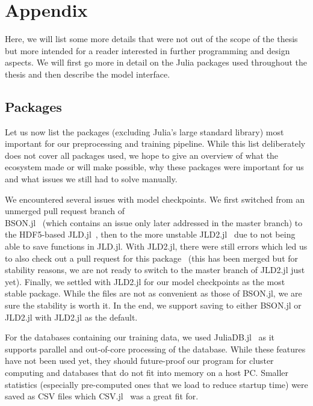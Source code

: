 \section{Appendix}

Here, we will list some more details that were not out of the scope of
the thesis but more intended for a reader interested in further
programming and design aspects. We will first go more in detail on the
Julia packages used throughout the thesis and then describe the model
interface.

\subsection{Packages}
\label{sec:packages}

Let us now list the packages (excluding Julia's large standard
library) most important for our preprocessing and training pipeline.
While this list deliberately does not cover all packages used, we hope
to give an overview of what the ecosystem made or will make possible,
why these packages were important for us and what issues we still had
to solve manually.

We encountered several issues with model checkpoints. We first
switched from an unmerged pull request branch of \\
\mbox{BSON.jl}~\cite{JuliaIOBSONJl2019,keslerSavingArrayLength} (which
contains an issue only later addressed in the master branch) to the
HDF5-based \mbox{JLD.jl}~\cite{JuliaIOJLDJl2019}, then to the more
unstable \mbox{JLD2.jl}~\cite{JuliaIOJLD2Jl2019} due to not being able
to save functions in \mbox{JLD.jl}. With \mbox{JLD2.jl}, there were
still errors which led us to also check out a pull request for this
package~\cite{palethorpeMaybeFixTypename} (this has been merged but
for stability reasons, we are not ready to switch to the master branch
of \mbox{JLD2.jl} just yet). Finally, we settled with \mbox{JLD2.jl}
for our model checkpoints as the most stable package. While the files
are not as convenient as those of \mbox{BSON.jl}, we are sure the
stability is worth it. In the end, we support saving to either
\mbox{BSON.jl} or \mbox{JLD2.jl} with \mbox{JLD2.jl} as the default.

For the databases containing our training data, we used
\mbox{JuliaDB.jl}~\cite{JuliaComputingJuliaDBJl2019} as it supports
parallel and out-of-core processing of the database. While these
features have not been used yet, they should future-proof our program
for cluster computing and databases that do not fit into memory on a
host PC. Smaller statistics (especially pre-computed ones that we load
to reduce startup time) were saved as CSV files which
\mbox{CSV.jl}~\cite{JuliaDataCSVJl2019} was a great fit for.

